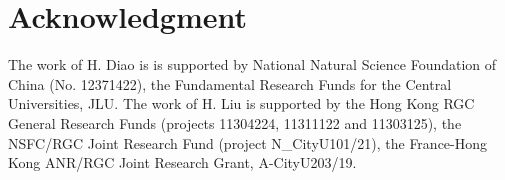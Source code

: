 \documentclass[11pt,reqno,oneside]{amsart}
\newcommand{\Blu}[1]{{\color{blue}#1}}
\numberwithin{equation}{section}
\theoremstyle{definition}
\theoremstyle{remark}
\numberwithin{equation}{section}
\begin{document}
	
	
	\section*{Acknowledgment}
	The work of H. Diao is is supported by National Natural Science Foundation of China  (No. 12371422), the Fundamental Research Funds for the Central Universities, JLU.   The work of H. Liu is supported by the Hong Kong RGC General Research Funds (projects 11304224, 11311122 and 11303125),  the NSFC/RGC Joint Research Fund (project N\_CityU101/21), the France-Hong Kong ANR/RGC Joint Research Grant, A-CityU203/19.
	
	
	\medskip
	
\end{document}
